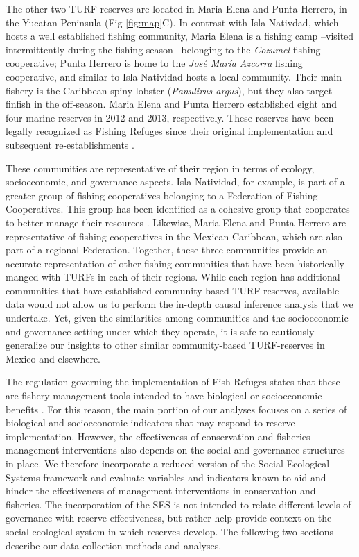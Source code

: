 \documentclass{frontiersSCNS}
\begin{document}
The other two TURF-reserves are located in Maria Elena and Punta
Herrero, in the Yucatan Peninsula (Fig \ref{fig:map}C). In contrast with
Isla Nativdad, which hosts a well established fishing community, Maria
Elena is a fishing camp --visited intermittently during the fishing
season-- belonging to the \emph{Cozumel} fishing cooperative; Punta
Herrero is home to the \emph{José María Azcorra} fishing cooperative,
and similar to Isla Natividad hosts a local community. Their main
fishery is the Caribbean spiny lobster (\emph{Panulirus argus}), but
they also target finfish in the off-season. Maria Elena and Punta
Herrero established eight and four marine reserves in 2012 and 2013,
respectively. These reserves have been legally recognized as Fishing
Refuges since their original implementation
\citep{dof_website_2012,dof_website_2013} and subsequent
re-establishments \citep{dof_website_2017b}.

These communities are representative of their region in terms of
ecology, socioeconomic, and governance aspects. Isla Natividad, for
example, is part of a greater group of fishing cooperatives belonging to
a Federation of Fishing Cooperatives. This group has been identified as
a cohesive group that cooperates to better manage their resources
\citep{mccay_2014,mccay_2017,acevesbueno_2017}. Likewise, Maria Elena
and Punta Herrero are representative of fishing cooperatives in the
Mexican Caribbean, which are also part of a regional Federation.
Together, these three communities provide an accurate representation of
other fishing communities that have been historically manged with TURFs
in each of their regions. While each region has additional communities
that have established community-based TURF-reserves, available data
would not allow us to perform the in-depth causal inference analysis
that we undertake. Yet, given the similarities among communities and the
socioeconomic and governance setting under which they operate, it is
safe to cautiously generalize our insights to other similar
community-based TURF-reserves in Mexico and elsewhere.

The regulation governing the implementation of Fish Refuges states that
these are fishery management tools intended to have biological or
socioeconomic benefits \citep{nom}. For this reason, the main portion of
our analyses focuses on a series of biological and socioeconomic
indicators that may respond to reserve implementation. However, the
effectiveness of conservation and fisheries management interventions
also depends on the social and governance structures in place. We
therefore incorporate a reduced version of the Social Ecological Systems
framework \citep{ostrom_2009} and evaluate variables and indicators
known to aid and hinder the effectiveness of management interventions in
conservation and fisheries. The incorporation of the SES is not intended
to relate different levels of governance with reserve effectiveness, but
rather help provide context on the social-ecological system in which
reserves develop. The following two sections describe our data
collection methods and analyses.
\end{document}

